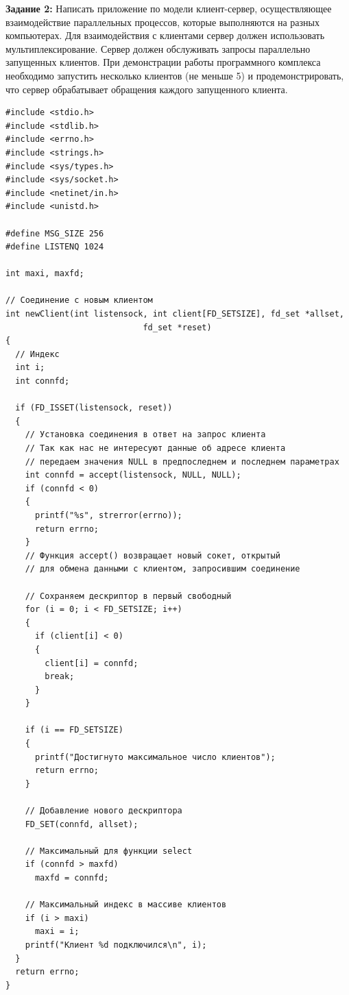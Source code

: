 \documentclass[a4paper,14pt]{extreport} %
\begin{document}
\newpage

\textbf{Задание 2:} Написать приложение по модели клиент-сервер, осуществляющее взаимодействие параллельных процессов, которые выполняются на разных компьютерах. Для взаимодействия с клиентами сервер должен использовать мультиплексирование. Сервер должен обслуживать запросы параллельно запущенных клиентов. При демонстрации работы программного комплекса необходимо запустить несколько клиентов (не меньше 5) и продемонстрировать, что сервер обрабатывает обращения каждого запущенного клиента.

\begin{lstlisting}[caption=Код сервера]
#include <stdio.h>
#include <stdlib.h>
#include <errno.h>
#include <strings.h>
#include <sys/types.h>
#include <sys/socket.h>
#include <netinet/in.h>
#include <unistd.h>

#define MSG_SIZE 256
#define LISTENQ 1024

int maxi, maxfd;

// Соединение с новым клиентом
int newClient(int listensock, int client[FD_SETSIZE], fd_set *allset, 
							fd_set *reset)
{
  // Индекс
  int i;
  int connfd;

  if (FD_ISSET(listensock, reset))
  {
    // Установка соединения в ответ на запрос клиента
    // Так как нас не интересуют данные об адресе клиента
    // передаем значения NULL в предпоследнем и последнем параметрах
    int connfd = accept(listensock, NULL, NULL);
    if (connfd < 0)
    {
      printf("%s", strerror(errno));
      return errno;
    }
    // Функция accept() возвращает новый сокет, открытый
    // для обмена данными с клиентом, запросившим соединение

    // Сохраняем дескриптор в первый свободный
    for (i = 0; i < FD_SETSIZE; i++)
    {
      if (client[i] < 0)
      {
        client[i] = connfd;
        break;
      }
    }

    if (i == FD_SETSIZE)
    {
      printf("Достигнуто максимальное число клиентов");
      return errno;
    }

    // Добавление нового дескриптора
    FD_SET(connfd, allset);

    // Максимальный для функции select
    if (connfd > maxfd)
      maxfd = connfd;

    // Максимальный индекс в массиве клиентов
    if (i > maxi)
      maxi = i;
    printf("Клиент %d подключился\n", i);
  }
  return errno;
}


\end{lstlisting}
\end{document}
